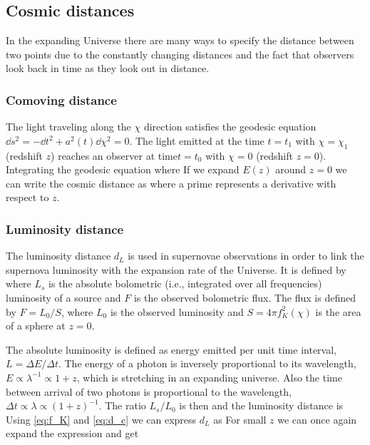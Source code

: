 \subsection{Cosmic distances}
In the expanding Universe there are many ways to specify the distance between two points due to the constantly changing distances and the fact that observers look back in time as they look out in distance.
\subsubsection{Comoving distance}
The light traveling along the $\chi$ direction satisfies the geodesic equation $\dd s^2=-\dd t^2+a^2(t)\dd \chi^2=0$. The light emitted at the time $t=t_1$ with $\chi=\chi_1$ (redshift $z$) reaches an observer at time$t=t_0$ with $\chi=0$ (redshift $z=0$). Integrating the geodesic equation
where
If we expand $E(z)$ around $z=0$ we can write the cosmic distance as
where a prime represents a derivative with respect to $z$.
\subsubsection{Luminosity distance}
The luminosity distance $d_L$ is used in supernovae observations in order to link the supernova luminosity with the expansion rate of the Universe. It is defined by
where $L_s$ is the absolute bolometric (i.e., integrated over all frequencies) luminosity of a source and $F$ is the observed bolometric flux. The flux is defined by $F=L_0/S$, where $L_0$ is the observed luminosity and $S=4\pi f_K^2(\chi)$ is the area of a sphere at $z=0$.

The absolute luminosity is defined as energy emitted per unit time interval, $L=\Delta E/\Delta t$. The energy of a photon is inversely proportional to its wavelength, $E\propto\lambda^{-1}\propto 1+z$, which is stretching in an expanding universe. Also the time between arrival of two photons is proportional to the wavelength, $\Delta t\propto\lambda\propto(1+z)^{-1}$. The ratio $L_s/L_0$ is then
and the luminosity distance is
Using \autoref{eq:f_K} and \autoref{eq:d_c} we can express $d_L$ as
For small $z$ we can once again expand the expression and get
